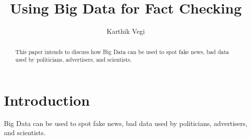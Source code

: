\documentclass[sigconf]{acmart}
\begin{document}
\title{Using Big Data for Fact Checking}

\author{Karthik Vegi}

\renewcommand{\shortauthors}{K. Vegi}


\begin{abstract}
This paper intends to discuss how Big Data can be used to spot fake news, bad data used by politicians, advertisers, and scientists.
\end{abstract}



\maketitle

\section{Introduction}

Big Data can be used to spot fake news, bad data used by politicians, advertisers, and scientists.
\end{document}

